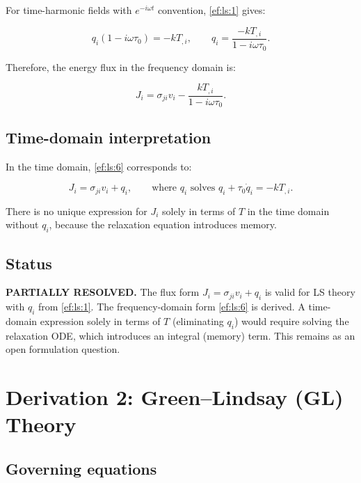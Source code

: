 For time-harmonic fields with $e^{-i\omega t}$ convention, \eqref{ef:ls:1} gives:

\begin{equation}
q_i(1 - i\omega\tau_0) = -k T_{,i},
\qquad
q_i = \frac{-k T_{,i}}{1 - i\omega\tau_0}.
\label{ef:ls:5}
\end{equation}

Therefore, the energy flux in the frequency domain is:

\begin{equation}
J_i = \sigma_{ji}v_i - \frac{k T_{,i}}{1 - i\omega\tau_0}.
\label{ef:ls:6}
\end{equation}

\subsection{Time-domain interpretation}

In the time domain, \eqref{ef:ls:6} corresponds to:

\begin{equation}
J_i = \sigma_{ji}v_i + q_i,
\qquad \text{where } q_i \text{ solves } q_i + \tau_0\dot{q}_i = -k T_{,i}.
\label{ef:ls:7}
\end{equation}

There is no unique expression for $J_i$ solely in terms of $T$ in the time domain without $q_i$, because the relaxation equation introduces memory.

\subsection{Status}

\textbf{PARTIALLY RESOLVED.} The flux form $J_i = \sigma_{ji}v_i + q_i$ is valid for LS theory with $q_i$ from \eqref{ef:ls:1}. The frequency-domain form \eqref{ef:ls:6} is derived. A time-domain expression solely in terms of $T$ (eliminating $q_i$) would require solving the relaxation ODE, which introduces an integral (memory) term. This remains as an open formulation question.

\section{Derivation 2: Green--Lindsay (GL) Theory}

\subsection{Governing equations}

